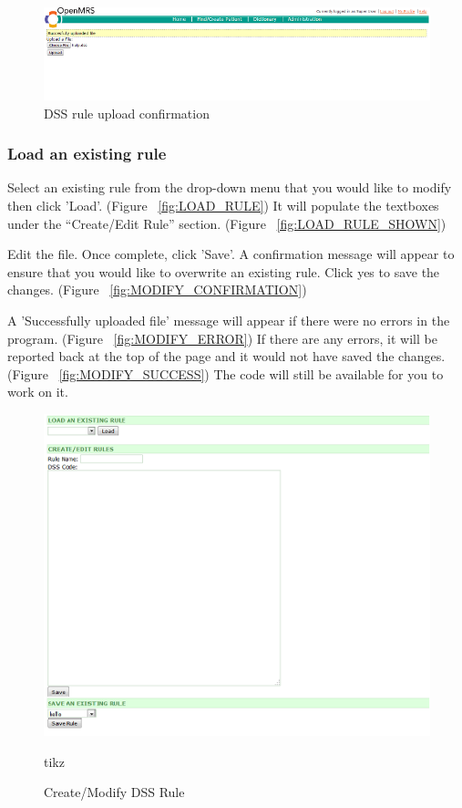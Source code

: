 \documentclass[12pt,letterpaper]{article}
\begin{document}
\begin{figure}\begin{center}
\includegraphics[width=6.5in]{user_guide/upload_success.png}
\end{center}
\caption{DSS rule upload confirmation}
\label{fig:UPLOAD_SUCCESS}
\end{figure}


\subsubsection{Load an existing rule}

Select an existing rule from the drop-down menu that you would like to modify then click 'Load'. (Figure ~\ref{fig:LOAD_RULE})
It will populate the textboxes under the “Create/Edit Rule” section. 
(Figure ~\ref{fig:LOAD_RULE_SHOWN})

Edit the file. Once complete, click 'Save'. A confirmation message will appear to ensure that you would like to overwrite an existing rule. Click yes to save the changes.
(Figure ~\ref{fig:MODIFY_CONFIRMATION})

A 'Successfully uploaded file' message will appear if there were no errors in the program. 
(Figure ~\ref{fig:MODIFY_ERROR})
If there are any errors, it will be reported back at the top of the page and it would not have saved the changes. 
(Figure ~\ref{fig:MODIFY_SUCCESS})
The code will still be available for you to work on it.

\begin{figure}\begin{center}
\includegraphics[width=6.5in]{user_guide/create_modify.png}
\end{center}
\caption{Create/Modify DSS Rule}
\label{fig:CREATE_MODIFY}tikz
\end{figure}
\end{document}
